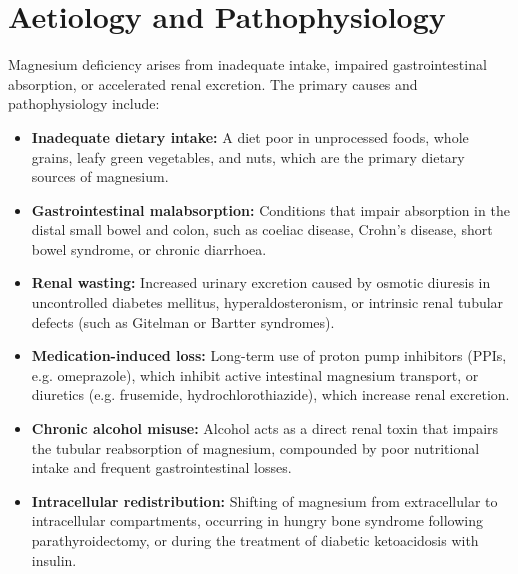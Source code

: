 \section*{Aetiology and Pathophysiology}
Magnesium deficiency arises from inadequate intake, impaired gastrointestinal absorption, or accelerated renal excretion. The primary causes and pathophysiology include:
\begin{itemize}
    \item \textbf{Inadequate dietary intake:} A diet poor in unprocessed foods, whole grains, leafy green vegetables, and nuts, which are the primary dietary sources of magnesium.
    \item \textbf{Gastrointestinal malabsorption:} Conditions that impair absorption in the distal small bowel and colon, such as coeliac disease, Crohn's disease, short bowel syndrome, or chronic diarrhoea.
    \item \textbf{Renal wasting:} Increased urinary excretion caused by osmotic diuresis in uncontrolled diabetes mellitus, hyperaldosteronism, or intrinsic renal tubular defects (such as Gitelman or Bartter syndromes).
    \item \textbf{Medication-induced loss:} Long-term use of proton pump inhibitors (PPIs, e.g. omeprazole), which inhibit active intestinal magnesium transport, or diuretics (e.g. frusemide, hydrochlorothiazide), which increase renal excretion.
    \item \textbf{Chronic alcohol misuse:} Alcohol acts as a direct renal toxin that impairs the tubular reabsorption of magnesium, compounded by poor nutritional intake and frequent gastrointestinal losses.
    \item \textbf{Intracellular redistribution:} Shifting of magnesium from extracellular to intracellular compartments, occurring in hungry bone syndrome following parathyroidectomy, or during the treatment of diabetic ketoacidosis with insulin.
\end{itemize}

